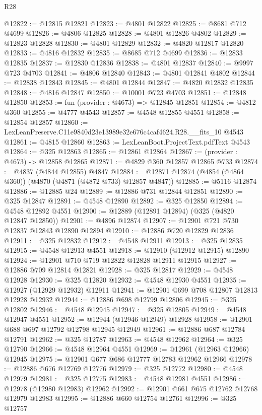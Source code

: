 \begin{lexlean}{R28}
\begin{coremodule}
@12822 := @12815 @12821
@12823 := @4801 @12822
@12825 := @8681 @712 @4699
@12826 := @4806 @12825
@12828 := @4801 @12826 @4802
@12829 := @12823 @12828
@12830 := @4801 @12829
@12832 := @4820 @12817 @12820
@12833 := @4816 @12832
@12835 := @8685 @712 @4699
@12836 := @12833 @12835
@12837 := @12830 @12836
@12838 := @4801 @12837
@12840 := @9997 @723 @4703
@12841 := @4806 @12840
@12843 := @4801 @12841 @4802
@12844 := @12838 @12843
@12845 := @4801 @12844
@12847 := @4820 @12832 @12835
@12848 := @4816 @12847
@12850 := @10001 @723 @4703
@12851 := @12848 @12850
@12853 := fun (provider : @4673) => @12845 @12851
@12854 := @4812 @360
@12855 := @4777 @4543
@12857 := @4548 @12855 @4551
@12858 := @12854 @12857
@12860 := LexLeanPreserve.C11e9840d23e13989e32e676c4caf4624.R28.__fits_10 @4543
@12861 := @4815 @12860
@12863 := LexLeanBoot.ProjectText.pdfText @4543
@12864 := @325 @12863
@12865 := @12861 @12864
@12867 := (provider : @4673) -> @12858 @12865
@12871 := @4829 @360 @12857 @12865 @733
@12874 := @4837 (@4844 @12855) @4847
@12884 := @12871 @12874 (@4854 (@4864 @360)) (@4870 (@4871 (@4872 @733) @12857 @4847))
@12885 := @5116 @12874
@12886 := @12885 @24
@12889 := @12886 @731 @12844 @12851
@12890 := @325 @12847
@12891 := @4548 @12890
@12892 := @325 @12850
@12894 := @4548 @12892 @4551
@12900 := @12889 (@12891 @12894) (@325 (@4820 @12847 @12850))
@12901 := @4896 @12874
@12907 := @12901 @721 @730 @12837 @12843 @12890 @12894
@12910 := @12886 @720 @12829 @12836
@12911 := @325 @12832
@12912 := @4548 @12911
@12913 := @325 @12835
@12915 := @4548 @12913 @4551
@12918 := @12910 (@12912 @12915) @12890
@12924 := @12901 @710 @719 @12822 @12828 @12911 @12915
@12927 := @12886 @709 @12814 @12821
@12928 := @325 @12817
@12929 := @4548 @12928
@12930 := @325 @12820
@12932 := @4548 @12930 @4551
@12935 := @12927 (@12929 @12932) @12911
@12941 := @12901 @699 @708 @12807 @12813 @12928 @12932
@12944 := @12886 @698 @12799 @12806
@12945 := @325 @12802
@12946 := @4548 @12945
@12947 := @325 @12805
@12949 := @4548 @12947 @4551
@12952 := @12944 (@12946 @12949) @12928
@12958 := @12901 @688 @697 @12792 @12798 @12945 @12949
@12961 := @12886 @687 @12784 @12791
@12962 := @325 @12787
@12963 := @4548 @12962
@12964 := @325 @12790
@12966 := @4548 @12964 @4551
@12969 := @12961 (@12963 @12966) @12945
@12975 := @12901 @677 @686 @12777 @12783 @12962 @12966
@12978 := @12886 @676 @12769 @12776
@12979 := @325 @12772
@12980 := @4548 @12979
@12981 := @325 @12775
@12983 := @4548 @12981 @4551
@12986 := @12978 (@12980 @12983) @12962
@12992 := @12901 @661 @675 @12762 @12768 @12979 @12983
@12995 := @12886 @660 @12754 @12761
@12996 := @325 @12757

\end{coremodule}
\end{lexlean}
